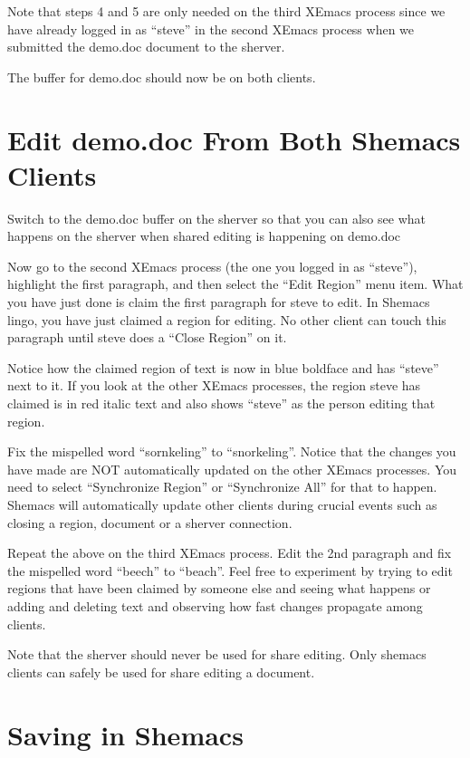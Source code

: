 Note that steps 4 and 5 are only needed on the third XEmacs process since we 
have already logged in as ``steve'' in the second XEmacs process when we 
submitted the demo.doc document to the sherver.

The buffer for demo.doc should now be on both clients.

\section{Edit demo.doc From Both Shemacs Clients}

Switch to the demo.doc buffer on the sherver so that you can also see what 
happens on the sherver when shared editing is happening on demo.doc

Now go to the second XEmacs process (the one you logged in as ``steve''), 
highlight the first paragraph, and then select the ``Edit Region'' menu item.
What you have just done is claim the first paragraph for steve to edit.  In 
Shemacs lingo, you have just claimed a region for editing.  No other client 
can touch this paragraph until steve does a ``Close Region'' on it.

Notice how the claimed region of text is now in blue boldface and has ``steve''
next to it.  If you look at the other XEmacs processes, the region steve has 
claimed is in red italic text and also shows ``steve'' as the person editing 
that region. 

Fix the mispelled word ``sornkeling'' to ``snorkeling''.  Notice that the changes 
you have made are NOT automatically updated on the other XEmacs processes.  
You need to select ``Synchronize Region'' or ``Synchronize All'' for that to 
happen.  Shemacs will automatically update other clients during crucial events
such as closing a region, document or a sherver connection.

Repeat the above on the third XEmacs process.  Edit the 2nd paragraph and fix
the mispelled word ``beech'' to ``beach''.  Feel free to experiment by trying to 
edit regions that have been claimed by someone else and seeing what happens or 
adding and deleting text and observing how fast changes propagate among 
clients.

Note that the sherver should never be used for share editing.  Only shemacs 
clients can safely be used for share editing a document.

\section{Saving in Shemacs}

